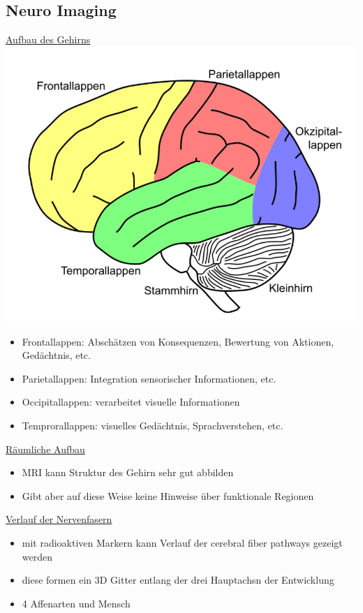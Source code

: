 \documentclass[a4paper,10pt,oneside]{article}
\begin{document}
\subsection{Neuro Imaging}

\underline{Aufbau des Gehirns} \\
\includegraphics[scale=0.3]{Grafiken/1816.png}

	\begin{itemize}
		\item Frontallappen: Abschätzen von Konsequenzen, Bewertung von Aktionen, Gedächtnis, etc.
		\item Parietallappen: Integration sensorischer Informationen, etc.
		\item Occipitallappen: verarbeitet visuelle Informationen
		\item Temprorallappen: visuelles Gedächtnis, Sprachverstehen, etc.
	\end{itemize}
	
\underline{Räumliche Aufbau} \\
	\begin{itemize}
		\item MRI kann Struktur des Gehirn sehr gut abbilden
		\item Gibt aber auf diese Weise keine Hinweise über funktionale Regionen
	\end{itemize}
	
\underline{Verlauf der Nervenfasern} \\
	\begin{itemize}
		\item mit radioaktiven Markern kann Verlauf der cerebral fiber pathways gezeigt werden
		\item diese formen ein 3D Gitter entlang der drei Hauptachsn der Entwicklung 
		\item 4 Affenarten und Mensch
	\end{itemize}
	
\end{document}
